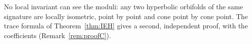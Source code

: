 %
%


No local invariant can see the moduli: any two hyperbolic orbifolds of the same signature are
locally isometric, point by point and cone point by cone point. The trace formula of
Theorem~\ref{thm:IEH} gives a second, independent proof, with the coefficients
(Remark~\ref{rem:proofC}).




